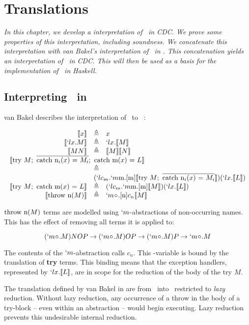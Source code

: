\chapter{Translations}\label{chapter:translations}

\textit{
In this chapter, we develop a interpretation of \lmu\ in CDC.
We prove some properties of this interpretation, including \emph{soundness}.
We concatenate this interpretation with van Bakel's interpretation of \ltry\ in \lmu.
This concatenation yields an interpretation of \ltry\ in CDC.
This will then be used as a basis for the implementation of \ltry\ in Haskell.
}

\section{Interpreting \ltry\ in \lmu}

van Bakel describes the interpretation of \ltry\ to \lmu\ \cite{Bakel15}:

{
\[
  \begin{array}{rcl}
    \tr{x} &\triangleq& x \\
    \tr{`lx.M} &\triangleq& `lx.\tr{M} \\
    \tr{M N} &\triangleq& \tr{M}\tr{N} \\
    \multicolumn{3}{l}{\tr{\try M;\ \mcatch;\ \catch{m($x$) = $L$}}} \\
    & \triangleq & \\
    &\multicolumn{2}{l}{ (`lc_m.`m\text{m}.[\text{m}]\tr{\try M;\ \mcatch})(`lx.\tr{L})} \\
    
    \tr{\try M;\ \catch{m($x$) = $L$}} & \triangleq & (`lc_m.`m\text{m}.[\text{m}]\tr{M})(`lx.\tr{L}) \\
    \tr{\throw{n($M$)}} &\triangleq& `m\nonocc.[\text{n}]c_n\tr{M}
  \end{array}
\]
}

$\text{throw n($M$)}$ terms are modelled using $`m$-abstractions of non-occurring names. This has the effect of removing all terms it is applied to:

\[
  (`m\nonocc.M)NOP \to (`m\nonocc.M)OP \to (`m\nonocc.M)P \to `m\nonocc.M
\]

The contents of the $`m$-abstraction calls $c_n$.
This \lam-variable is bound by the translation of \textbf{try} terms.
This binding means that the exception handlers, represented by $`lx.\llbracket L \rrbracket$,
are in scope for the reduction of the body of the try $M$.

The translation defined by van Bakel in \cite{Bakel15} are from \ltry\ into \lmu\ restricted to \emph{lazy} reduction.
Without lazy reduction, any occurrence of a throw in the body of a try-block -- even within an abstraction -- would begin executing.
Lazy reduction prevents this undesirable internal reduction. 

